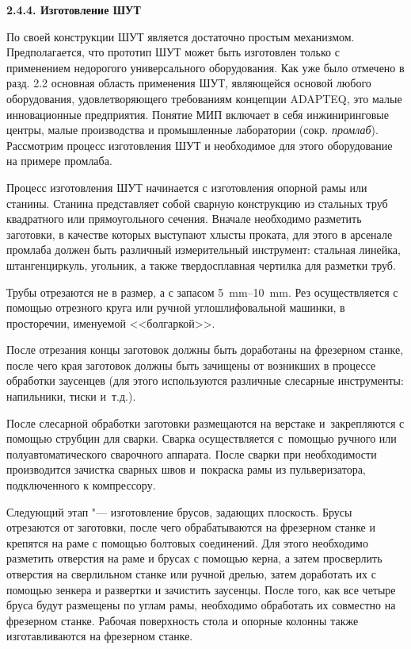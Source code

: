\textbf{2.4.4. Изготовление ШУТ}

По своей конструкции ШУТ является достаточно простым механизмом. Предполагается, что прототип ШУТ может быть изготовлен только с применением недорогого универсального оборудования. Как уже было отмечено в разд. 2.2 основная область применения ШУТ, являющейся основой любого оборудования, удовлетворяющего требованиям концепции ADAPTEQ, это малые инновационные предприятия. Понятие МИП включает в себя инжиниринговые центры, малые производства и промышленные лаборатории (сокр. \textit{промлаб}). Рассмотрим процесс изготовления ШУТ и необходимое для этого оборудование на примере промлаба.

Процесс изготовления ШУТ начинается с изготовления опорной рамы или станины. Станина представляет собой сварную конструкцию из стальных труб квадратного или прямоугольного сечения. Вначале необходимо разметить заготовки, в качестве которых выступают хлысты проката, для этого в арсенале промлаба должен быть различный измерительный инструмент: стальная линейка, штангенциркуль, угольник, а также твердосплавная чертилка для разметки труб.

Трубы отрезаются не в размер, а с запасом \SIrange{5}{10}{\milli\metre}. Рез осуществляется с помощью отрезного круга или ручной углошлифовальной машинки, в просторечии, именуемой <<болгаркой>>.

После отрезания концы заготовок должны быть доработаны на фрезерном станке, после чего края заготовок должны быть зачищены от возникших в процессе обработки заусенцев (для этого используются различные слесарные инструменты: напильники, тиски и~т.\:д.).

После слесарной обработки заготовки размещаются на верстаке и~закрепляются с помощью струбцин для сварки. Сварка осуществляется с~помощью ручного или полуавтоматического сварочного аппарата. После сварки при необходимости производится зачистка сварных швов и~покраска рамы из пульверизатора, подключенного к компрессору.

Следующий этап "--- изготовление брусов, задающих плоскость. Брусы отрезаются от заготовки, после чего обрабатываются на фрезерном станке и крепятся на раме с помощью болтовых соединений. Для этого необходимо разметить отверстия на раме и брусах с помощью керна, а затем просверлить отверстия на сверлильном станке или ручной дрелью, затем доработать их с помощью зенкера и развертки и зачистить заусенцы. После того, как все четыре бруса будут размещены по углам рамы, необходимо обработать их совместно на фрезерном станке. Рабочая поверхность стола и опорные колонны также изготавливаются на фрезерном станке.

